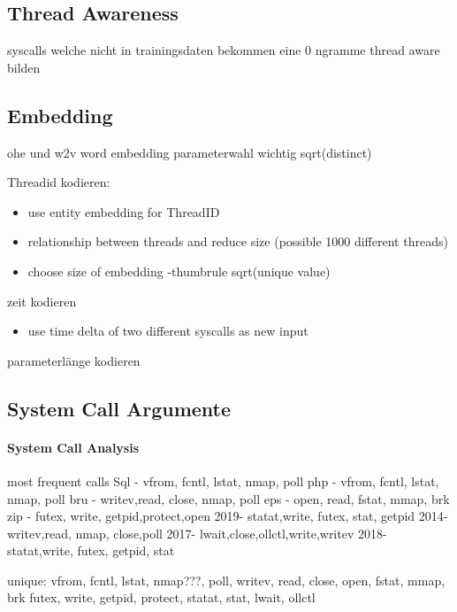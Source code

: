     \subsection{Thread Awareness}
        syscalls welche nicht in trainingsdaten bekommen eine 0
        ngramme thread aware bilden

    \subsection{Embedding}
    \label{sec:embedding}
        ohe und w2v
        word embedding parameterwahl wichtig sqrt(distinct)

        Threadid kodieren: 
        \begin{itemize}
            \item use entity embedding for ThreadID \cite{GUO2016} 
            \item relationship between threads and reduce size (possible 1000 different threads)
            \item choose size of embedding -thumbrule sqrt(unique value) 
        \end{itemize}
        zeit kodieren
        \begin{itemize}
            \item use time delta of two different syscalls as new input
        \end{itemize}
        parameterlänge kodieren

    \subsection{System Call Argumente}
    \label{sec:args}
        \paragraph{System Call Analysis}  
            most frequent calls
            Sql - vfrom, fcntl, lstat, nmap, poll
            php - vfrom, fcntl, lstat, nmap, poll
            bru - writev,read,  close, nmap, poll
            eps - open,  read,  fstat, mmap, brk
            zip - futex, write, getpid,protect,open
            2019- statat,write, futex, stat, getpid
            2014- writev,read,  nmap,  close,poll
            2017- lwait,close,ollctl,write,writev
            2018- statat,write, futex, getpid, stat


            unique:
                vfrom, fcntl, lstat, nmap???, poll, writev, read, close, open, fstat, mmap, brk
                futex, write, getpid, protect, statat, stat, lwait, ollctl

